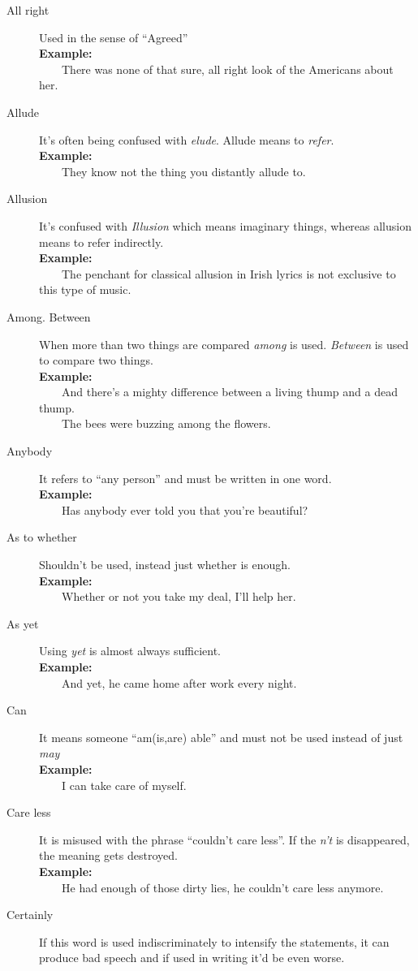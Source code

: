 \documentclass[12pt]{report}
\newcommand{\xmpl}{\textbf{Example:}\\} %
\newcommand{\indnt}{\ \ \ \ } %
\begin{document}
\begin{description}
	\item[All right] Used in the sense of ``Agreed''\\
	\xmpl
	\indnt There was none of that sure, all right look of the Americans about her.
	\item[Allude] It's often being confused with \textit{elude}. Allude means to \textit{refer}.\\
	\xmpl
	\indnt They know not the thing you distantly allude to.
	\item[Allusion] It's confused with \textit{Illusion} which means imaginary things, whereas allusion means to refer indirectly.\\
	\xmpl
	\indnt The penchant for classical allusion in Irish lyrics is not exclusive to this type of music. 
	\item[Among. Between] When more than two things are compared \textit{among} is used. \emph{Between} is used to compare two things.\\
	\xmpl
	\indnt And there's a mighty difference between a living thump and a dead thump.\\
	\indnt The bees were buzzing among the flowers.
	\item[Anybody] It refers to ``any person'' and must be written in one word.\\
	\xmpl
	\indnt Has anybody ever told you that you're beautiful?
	\item[As to whether] Shouldn't be used, instead just whether is enough.\\
	\xmpl
	\indnt Whether or not you take my deal, I'll help her.
	\item[As yet] Using \textit{yet} is almost always sufficient.\\
	\xmpl
	\indnt And yet, he came home after work every night.
	\item[Can] It means someone ``am(is,are) able'' and must not be used instead of just \textit{may}\\
	\xmpl
	\indnt I can take care of myself.
	\item[Care less] It is misused with the phrase ``couldn't care less''. If the \textit{n't} is disappeared, the meaning gets destroyed.\\
	\xmpl
	\indnt He had enough of those dirty lies, he couldn't care less anymore.
	\item[Certainly] If this word is used indiscriminately to intensify the statements, it can produce bad speech and if used in writing it'd be even worse.\\

\end{description}
\end{document}

